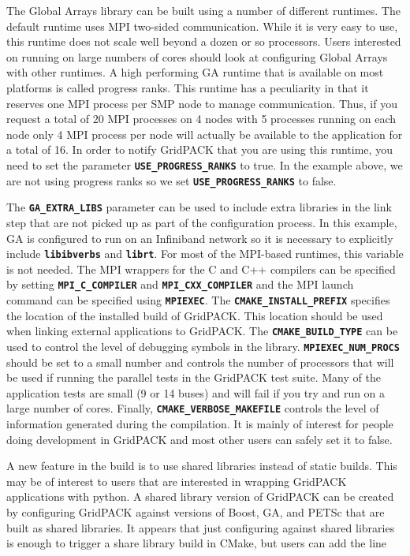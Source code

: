 \documentclass[12pt]{report} %
\begin{document}
The Global Arrays library can be built using a number of different runtimes. The default runtime uses MPI two-sided communication. While it is very easy to use, this runtime does not scale well beyond a dozen or so processors. Users interested on running on large numbers of cores should look at configuring Global Arrays with other runtimes. A high performing GA runtime that is available on most platforms is called progress ranks. This runtime has a peculiarity in that it reserves one MPI process per SMP node to manage communication. Thus, if you request a total of 20 MPI processes on 4 nodes with 5 processes running on each node only 4 MPI process per node will actually be available to the application for a total of 16. In order to notify GridPACK that you are using this runtime, you need to set the parameter \texttt{\textbf{USE\_PROGRESS\_RANKS}} to true. In the example above, we are not using progress ranks so we set \texttt{\textbf{USE\_PROGRESS\_RANKS}} to false.

The \texttt{\textbf{GA\_EXTRA\_LIBS}} parameter can be used to include extra libraries in the link step that are not picked up as part of the configuration process. In this example, GA is configured to run on an Infiniband network so it is necessary to explicitly include \texttt{\textbf{libibverbs}} and \texttt{\textbf{librt}}. For most of the MPI-based runtimes, this variable is not needed.
The MPI wrappers for the C and C++ compilers can be specified by setting \texttt{\textbf{MPI\_C\_COMPILER}} and \texttt{\textbf{MPI\_CXX\_COMPILER}} and the MPI launch command can be specified using \texttt{\textbf{MPIEXEC}}. The \texttt{\textbf{CMAKE\_INSTALL\_PREFIX}} specifies the location of the installed build of GridPACK. This location should be used when linking external applications to GridPACK. The \texttt{\textbf{CMAKE\_BUILD\_TYPE}} can be used to control the level of debugging symbols in the library. \texttt{\textbf{MPIEXEC\_NUM\_PROCS}} should be set to a small number and controls the number of processors that will be used if running the parallel tests in the GridPACK test suite. Many of the application tests are small (9 or 14 buses) and will fail if you try and run on a large number of cores. Finally, \texttt{\textbf{CMAKE\_VERBOSE\_MAKEFILE}} controls the level of information generated during the compilation. It is mainly of interest for people doing development in GridPACK and most other users can safely set it to false.

A new feature in the build is to use shared libraries instead of static builds. This may be of interest to users that are interested in wrapping GridPACK applications with python. A shared library version of GridPACK can be created by configuring GridPACK against versions of Boost, GA, and PETSc that are built as shared libraries. It appears that just configuring against shared libraries is enough to trigger a share library build in CMake, but users can add the line
\end{document}
